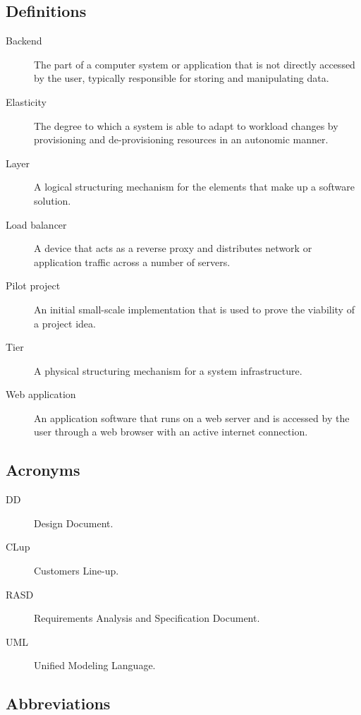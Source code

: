 \documentclass[../../main.tex]{subfiles}
\begin{document}
\subsection{Definitions}

\begin{description}

    \item[Backend] The part of a computer system or application that 
    is not directly accessed by the user, typically responsible for 
    storing and manipulating data.
     
    \item[Elasticity] The degree to which a system is able to adapt to workload changes by provisioning and de-provisioning resources in an autonomic manner.

    \item[Layer] A logical structuring mechanism for the elements that make up a software solution.

    \item[Load balancer] A device that acts as a reverse proxy and 
    distributes network or application traffic across a number of servers.

    \item[Pilot project] An initial small-scale implementation that is used to 
    prove the viability of a project idea.

    \item[Tier] A physical structuring mechanism for a system infrastructure.

    \item[Web application] An application software that runs on a web server and is 
    accessed by the user through a web browser with an active internet connection.
    
\end{description}

\subsection{Acronyms}

\begin{description}

    \item[DD] Design Document.
    
    \item[CLup] Customers Line-up.
    
    \item[RASD] Requirements Analysis and Specification Document.
    
    \item[UML] Unified Modeling Language.

\end{description}

\subsection{Abbreviations}
\end{document}
